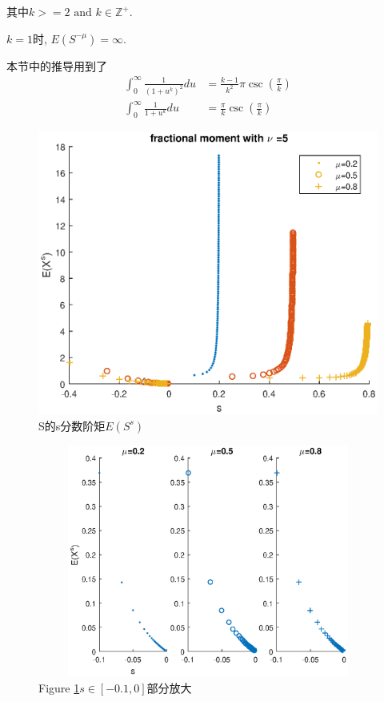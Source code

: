 \documentclass[a4paper, 12pt]{ctexart}
\begin{document}
其中$k>=2 \text{ and } k\in \mathbb{Z^+}$. 

$k=1$时, $E(S^{-\mu})=\infty$. 

本节中的推导用到了
\begin{align}
\int _0^{\infty}\frac{1}{(1+u^k)^2}du&=\frac{k-1}{k^2}\pi \csc (\frac{\pi}{k})\\
\int _0 ^{\infty} \frac{1}{1+u^k } du&=\frac{\pi}{k}\csc (\frac{\pi}{k})
\end{align}
\begin{figure}[h]
\centering
\includegraphics[width=5in]{fractional_moment.eps}
\caption{S的s分数阶矩$E(S^s)$}
\label{fig:1}
\end{figure}
\bigskip

\begin{figure}[h]
\centering
\includegraphics[width=5in,height=3in]{fractional_moment_neg.eps}
\caption{Figure \ref{fig:1}$s\in[-0.1,0]$部分放大}
\label{fig:2}
\end{figure}
\bigskip
\end{document}
